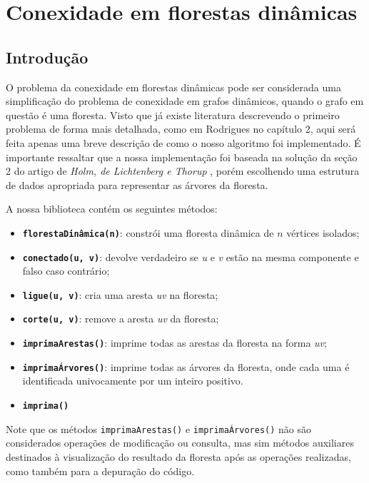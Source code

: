
\chapter{Conexidade em florestas dinâmicas}

\section{Introdução}

O problema da conexidade em florestas dinâmicas pode ser considerada uma simplificação do problema de conexidade em grafos dinâmicos, quando o grafo em questão é uma floresta. Visto que já existe literatura descrevendo o primeiro problema de forma mais detalhada, como em Rodrigues \cite{arthur} no capítulo 2, aqui será feita apenas uma breve descrição de como o nosso algoritmo foi implementado. É importante ressaltar que a nossa implementação foi baseada na solução da seção 2 do artigo de \textit{Holm, de Lichtenberg e Thorup} \cite{jacob_holm}, porém escolhendo uma estrutura de dados apropriada para representar as árvores da floresta.

A nossa biblioteca contém os seguintes métodos:

\begin{itemize}
    \item \texttt{\textbf{florestaDinâmica(n)}}: constrói uma floresta dinâmica de $n$ vértices isolados;
    \item \texttt{\textbf{conectado(u, v)}}: devolve verdadeiro se \textit{u} e \textit{v} estão na mesma componente e falso caso contrário;
    \item \texttt{\textbf{ligue(u, v)}}: cria uma aresta \textit{uv} na floresta;
    \item \texttt{\textbf{corte(u, v)}}: remove a aresta \textit{uv} da floresta;
    \item \texttt{\textbf{imprimaArestas()}}: imprime todas as arestas da floresta na forma \textit{uv};
    \item \texttt{\textbf{imprimaÁrvores()}}: imprime todas as árvores da floresta, onde cada uma é identificada univocamente por um inteiro positivo.
    \item \texttt{\textbf{imprima()}}
\end{itemize}

Note que os métodos \texttt{imprimaArestas()} e \texttt{imprimaÁrvores()} não são considerados operações de modificação ou consulta, mas sim métodos auxiliares destinados à visualização do resultado da floresta após as operações realizadas, como também para a depuração do código.  

